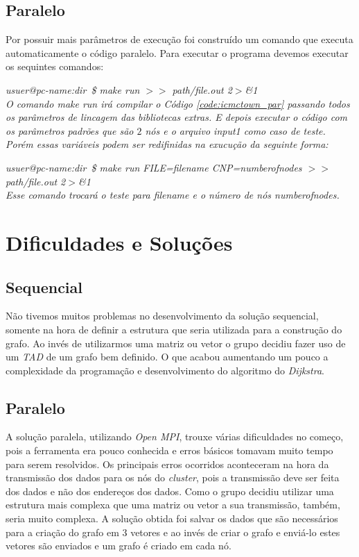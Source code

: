 \documentclass[11pt,twoside]{article}
\begin{document}
    \subsection{Paralelo}
    
    	Por possuir mais parâmetros de execução foi construído um comando que executa automaticamente
    	o código paralelo. Para executar o programa devemos executar os sequintes comandos:\\
    	
    	{\it usuer@pc-name:dir~\$ make run $>>$ {\it path}/{\it file.out 2}$>$\&{\it 1} \\
    	
    	O comando {\it make run} irá compilar o Código \ref{code:icmctown_par} passando
		todos os parâmetros de lincagem das bibliotecas extras. E depois executar o código
		com os parâmetros padrões que são $2$ nós e o arquivo {\it input1} como caso de teste.
		Porém essas variáveis podem ser redifinidas na exucução da seguinte forma:
		
    	{\it usuer@pc-name:dir~\$ make run FILE=filename CNP=numberofnodes $>>$ 
    	{\it path}/{\it file.out 2}$>$\&{\it 1} \\
    	
    	Esse comando trocará o teste para {\it filename} e o número de nós {\it numberofnodes}.

 
\section{Dificuldades e Soluções}

    \subsection{Sequencial}
    
        Não tivemos muitos problemas no desenvolvimento da solução sequencial, somente na hora
        de definir a estrutura que seria utilizada para a construção do grafo. Ao invés de utilizarmos
        uma matriz ou vetor o grupo decidiu fazer uso de um {\it TAD} de um grafo bem definido. O que
        acabou aumentando um pouco a complexidade da programação e desenvolvimento do algoritmo do
        {\it Dijkstra}.

    \subsection{Paralelo}
    
        A solução paralela, utilizando {\it Open MPI}, trouxe várias dificuldades no começo, pois a ferramenta
        era pouco conhecida e erros básicos tomavam muito tempo para serem resolvidos. Os principais erros
        ocorridos aconteceram na hora da transmissão dos dados para os nós do {\it cluster}, pois a transmissão
        deve ser feita dos dados e não dos endereços dos dados. Como o grupo decidiu utilizar uma estrutura mais
        complexa que uma matriz ou vetor a sua transmissão, também, seria muito complexa. A solução obtida foi
        salvar os dados que são necessários para a criação do grafo em 3 vetores e ao invés de criar o grafo
        e enviá-lo estes vetores são enviados e um grafo é criado em cada nó.

}}
\end{document}
